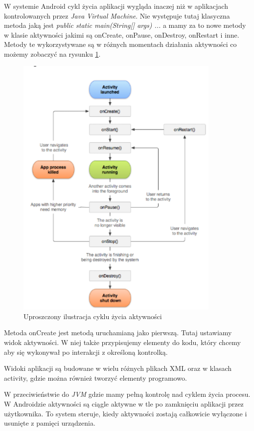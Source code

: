 \documentclass[a4paper,12pt, twoside]{article}
\begin{document}
	W systemie Android cykl życia aplikacji wygląda inaczej niż w aplikacjach kontrolowanych przez \textit{Java Virtual Machine}\cite{jvm}. Nie występuje tutaj klasyczna metoda jaką jest \textit{public static main(String[] args) {...}} a mamy za to nowe metody w klasie aktywności jakimi są onCreate, onPause, onDestroy, onRestart i inne. Metody te wykorzystywane są w różnych momentach działania aktywności co możemy zobaczyć na rysunku \ref{fig:lifecycle}.

	
	\begin{figure}[H]
	        \centering
			\vspace{.5cm}
			\includegraphics[width=10cm]{images/rys6_androidlifecycle.png}
			\vspace{.5cm}
			\caption{Uproszczony ilustracja cyklu życia aktywności\cite{lifecycle}}
            \label{fig:lifecycle}
	\end{figure}
	
	Metoda onCreate jest metodą uruchamianą jako pierwszą. Tutaj ustawiamy widok aktywności. W niej także przypisujemy elementy do kodu, który chcemy aby się wykonywał po interakcji z określoną kontrolką.
		
	Widoki aplikacji są budowane w wielu różnych plikach XML oraz w klasach activity, gdzie można również tworzyć elementy programowo.
	
	W przeciwieństwie do \textit{JVM} gdzie mamy pełną kontrolę nad cyklem życia procesu. W Androidzie aktywności są ciągle aktywne w tle po zamknięciu aplikacji przez użytkownika. To system steruje, kiedy aktywności zostają całkowicie wyłączone i usunięte z pamięci urządzenia. 
	
\end{document}
